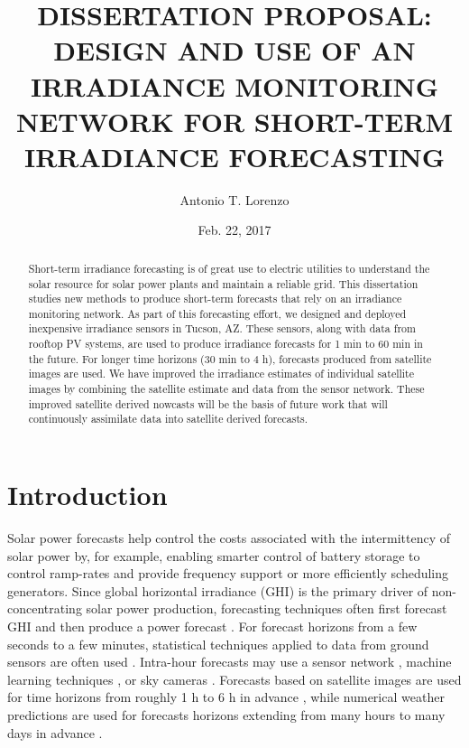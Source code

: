 \documentclass[12pt,letterpaper,notitlepage,openany]{article}
\begin{document}
\title{DISSERTATION PROPOSAL:\\ DESIGN AND USE OF AN IRRADIANCE
  MONITORING NETWORK FOR SHORT-TERM IRRADIANCE FORECASTING}
\author{Antonio T. Lorenzo}
\date{Feb. 22, 2017}
\maketitle

\begin{abstract} Short-term irradiance forecasting is of great use to
  electric utilities to understand the solar resource for solar power
  plants and maintain a reliable grid. This dissertation studies new
  methods to produce short-term forecasts that rely on an irradiance
  monitoring network. As part of this forecasting effort, we designed
  and deployed inexpensive irradiance sensors in Tucson, AZ. These
  sensors, along with data from rooftop PV systems, are used to
  produce irradiance forecasts for 1 min to 60 min in the future. For
  longer time horizons (30 min to 4 h), forecasts produced from
  satellite images are used. We have improved the irradiance estimates
  of individual satellite images by combining the satellite estimate
  and data from the sensor network. These improved satellite derived
  nowcasts will be the basis of future work that will continuously
  assimilate data into satellite derived forecasts.
\end{abstract}

\section{Introduction}
Solar power forecasts help control the costs associated with the
intermittency of solar power \citep{Joskow2011} by, for example,
enabling smarter control of battery storage to control ramp-rates and
provide frequency support \citep{Hill2012,Cormode2015} or more
efficiently scheduling generators.
Since global horizontal irradiance (GHI) is the primary driver of
non-concentrating solar power production, forecasting techniques often
first forecast GHI and then produce a power forecast
\citep{Kleissl2013,Inman2013}.
For forecast horizons from a few seconds to a few minutes, statistical
techniques applied to data from ground sensors are often used
\citep{Yang2015,Lipperheide2015}.
Intra-hour forecasts may use a sensor network \citep{Lonij2013},
machine learning techniques \citep{Chu2013}, or sky cameras
\citep{Chow2011}.
Forecasts based on satellite images are used for time horizons from
roughly 1 h to 6 h in advance \citep{Perez2010}, while numerical
weather predictions are used for forecasts horizons extending from
many hours to many days in advance \citep{Perez2013}.
\end{document}
